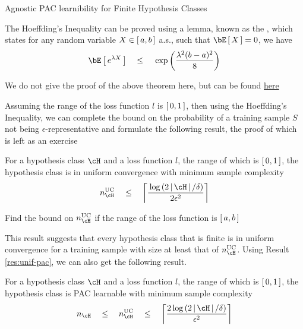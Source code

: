 \documentclass[11pt,a4paper]{article}
\begin{document}
\begin{ssection}[4]{Agnostic PAC learnibility for Finite Hypothesis Classes}
	\begin{remark}
		The Hoeffding's Inequality can be proved using a lemma, known as the , which states for any random variable $X \in \left[\,{a, b}\,\right]$ a.s., such that $\E{X} = 0$, we have
		\begin{equation}
			\E{\exp{\lambda X}}	\qle	\texp{\frac{\lambda^2(b-a)^2}{8}}
		\end{equation}
	\end{remark}

	We do not give the proof of the above theorem here, but can be found \href{https://en.wikipedia.org/wiki/Hoeffding\%27s\_inequality\#Proof}{here}

	Assuming the range of the loss function $l$ is $\left[\,{0, 1}\,\right]$, then using the Hoeffding's Inequality, we can complete the bound on the probability of a training sample $S$ not being $\epsilon$-representative and formulate the following result, the proof of which is left as an exercise

	\begin{result}
		For a hypothesis class $\cH$ and a loss function $l$, the range of which is $\left[\,{0, 1}\,\right]$, the hypothesis class is in uniform convergence with minimum sample complexity
		\begin{equation}
			n_\cH^{\text{UC}}	\qle	\ceil{\frac{\log{2 \abs{\cH} / \delta}}{2 \epsilon^2}}
		\end{equation}
	\end{result}

	\begin{exercise}
		Find the bound on $n_\cH^{\text{UC}}$ if the range of the loss function is $\left[\,{a, b}\,\right]$
	\end{exercise}

	This result suggests that every hypothesis class that is finite is in uniform convergence for a training sample with size at least that of $n_\cH^{\text{UC}}$. Using Result \ref{res:unif-pac}, we can also get the following result.

	\begin{result}
		For a hypothesis class $\cH$ and a loss function $l$, the range of which is $\left[\,{0, 1}\,\right]$, the hypothesis class is PAC learnable with minimum sample complexity
		\begin{equation}
			n_\cH	\qle	n_\cH^{\text{UC}}	\qle	\ceil{\frac{2 \log{2 \abs{\cH} / \delta}}{\epsilon^2}}
		\end{equation}
	\end{result}

\end{ssection}
\end{document}
